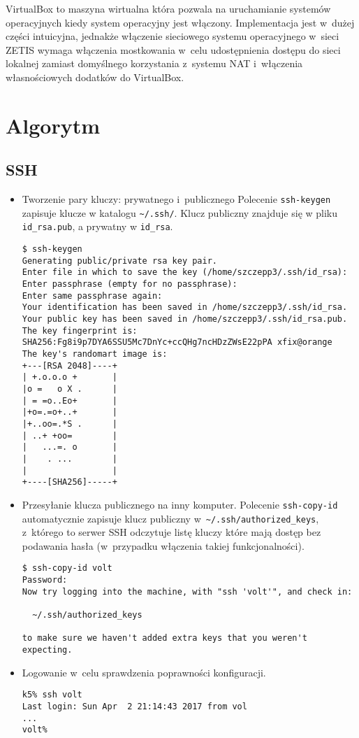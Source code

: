 \documentclass[a4paper,11pt]{article}
\begin{document}
VirtualBox to maszyna wirtualna która pozwala na uruchamianie systemów
operacyjnych kiedy system operacyjny jest włączony. Implementacja jest
w~dużej części intuicyjna, jednakże włączenie sieciowego systemu operacyjnego
w~sieci ZETIS wymaga włączenia mostkowania w~celu udostępnienia dostępu
do sieci lokalnej zamiast domyślnego korzystania z~systemu NAT i~włączenia
własnościowych dodatków do VirtualBox.


\section{Algorytm}

\subsection{SSH}

\begin{itemize}

\item Tworzenie pary kluczy: prywatnego i~publicznego
Polecenie \verb|ssh-keygen| zapisuje klucze w katalogu \verb|~/.ssh/|. Klucz publiczny znajduje się w pliku \verb|id_rsa.pub|, a prywatny w \verb|id_rsa|.


\begin{verbatim}
$ ssh-keygen 
Generating public/private rsa key pair.
Enter file in which to save the key (/home/szczepp3/.ssh/id_rsa): 
Enter passphrase (empty for no passphrase): 
Enter same passphrase again: 
Your identification has been saved in /home/szczepp3/.ssh/id_rsa.
Your public key has been saved in /home/szczepp3/.ssh/id_rsa.pub.
The key fingerprint is:
SHA256:Fg8i9p7DYA6SSU5Mc7DnYc+ccQHg7ncHDzZWsE22pPA xfix@orange
The key's randomart image is:
+---[RSA 2048]----+
| +.o.o.o +       |
|o =   o X .      |
| = =o..Eo+       |
|+o=.=o+..+       |
|+..oo=.*S .      |
| ..+ +oo=        |
|   ...=. o       |
|    . ...        |
|                 |
+----[SHA256]-----+
\end{verbatim}

\item Przesyłanie klucza publicznego na inny komputer. Polecenie
\verb|ssh-copy-id| automatycznie zapisuje klucz publiczny
w~\verb|~/.ssh/authorized_keys|, z~którego to serwer SSH odczytuje
listę kluczy które mają dostęp bez podawania hasła (w~przypadku
włączenia takiej funkcjonalności).

\begin{verbatim}
$ ssh-copy-id volt
Password: 
Now try logging into the machine, with "ssh 'volt'", and check in:

  ~/.ssh/authorized_keys

to make sure we haven't added extra keys that you weren't expecting.
\end{verbatim}

\item Logowanie w~celu sprawdzenia poprawności konfiguracji.

\begin{verbatim}
k5% ssh volt
Last login: Sun Apr  2 21:14:43 2017 from vol
...
volt%
\end{verbatim}

\end{itemize}
\end{document}

